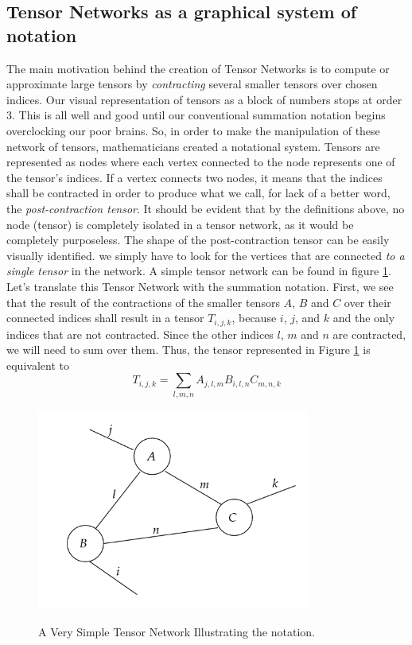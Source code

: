\documentclass{article}
\theoremstyle{definition}
\theoremstyle{definition}
\begin{document}
\subsection{Tensor Networks as a graphical system of notation}
The main motivation behind the creation of Tensor Networks is to compute or approximate large tensors by {\it contracting} several smaller tensors over chosen indices. Our visual representation of tensors as a block of numbers stops at order $3$. 
This is all well and good until our conventional summation notation begins overclocking our poor brains. 
So, in order to make the manipulation of these network of tensors, mathematicians created a notational system. 
Tensors are represented as nodes where each vertex connected to the node represents one of the tensor's indices. 
If a vertex connects two nodes, it means that the indices shall be contracted in order to produce what we call, for lack of a better word, the \emph{post-contraction tensor}. 
It should be evident that by the definitions above, no node (tensor) is completely isolated in a tensor network, as it would be completely purposeless. 
The shape of the post-contraction tensor can be easily visually identified. we simply have to look for the vertices that are connected \emph{to a single tensor} in the network.
A simple tensor network can be found in figure \ref{fig:tensor_net}.
Let's translate this Tensor Network with the summation notation. First, we see that the result of the contractions of the smaller tensors $A$, $B$ and $C$ over their connected indices shall result in a tensor $T_{i, j, k}$, because $i$, $j$, and $k$ and the only indices that are not contracted. Since the other indices $l$, $m$ and $n$ are contracted, we will need to sum over them. Thus, the tensor represented in Figure \ref{fig:tensor_net} is equivalent to
\[ 
    T_{i, j, k} = \sum_{l, m, n} A_{j, l, m} B_{i, l, n} C_{m, n, k}
\]

\begin{figure}[hbt!]
    \centering
    \caption{A Very Simple Tensor Network Illustrating the notation.}
    \includegraphics[width=0.8\textwidth]{images/2023-04-21-16-44-53.png}
    \label{fig:tensor_net}
\end{figure}
\end{document}
